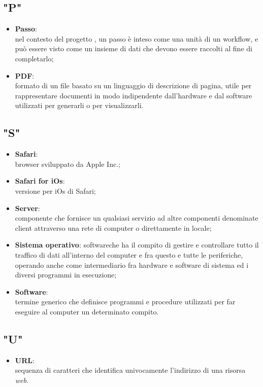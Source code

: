 \subsection*{"P"}
\begin{itemize}
\item \textbf{Passo}:\\ nel contesto del progetto \progetto{}, un passo è inteso come una unità di un workflow, e può essere visto come un insieme di dati che devono essere raccolti al fine di completarlo;
\item \textbf{PDF}:\\ formato di un file basato su un linguaggio di descrizione di pagina, utile per rappresentare documenti in modo indipendente dall'hardware e dal software utilizzati per generarli o per visualizzarli.
\end{itemize}

\subsection*{"S"}
\begin{itemize}
\item \textbf{Safari}:\\ browser sviluppato da Apple Inc.;
\item \textbf{Safari for iOs}:\\ versione per iOs di Safari;
\item \textbf{Server}:\\ componente che fornisce un qualsiasi servizio ad altre componenti denominate client attraverso una rete di computer o direttamente in locale;
\item \textbf{Sistema operativo}: software\ped che ha il compito di gestire e controllare tutto il traffico di dati all’interno del computer e fra questo e tutte le periferiche, operando anche come intermediario fra hardware e software di sistema ed i diversi programmi in esecuzione;
\item \textbf{Software}:\\ termine generico che definisce programmi e procedure utilizzati per far eseguire al computer un determinato compito.
\end{itemize} 

\subsection*{"U"}
\begin{itemize}
\item \textbf{URL}:\\ sequenza di caratteri che identifica univocamente l'indirizzo di una risorsa \textit{web}.
\end{itemize}